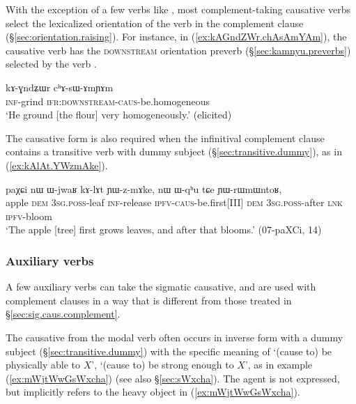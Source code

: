 With the exception of a few verbs like , most complement-taking causative verbs select the lexicalized orientation of the verb in the complement clause (§\ref{sec:orientation.raising}). For instance, in (\ref{ex:kAGndZWr.chAsAmYAm}), the causative verb  has the \textsc{downstream} orientation preverb  (§\ref{sec:kamnyu.preverbs}) selected by the verb .

\begin{exe}
\ex \label{ex:kAGndZWr.chAsAmYAm}
\gll kɤ-ɣndʑɯr cʰɤ-sɯ-ɤmɲɤm \\
\textsc{inf}-grind \textsc{ifr}:\textsc{downstream}-\textsc{caus}-be.homogeneous \\
\glt `He ground [the flour] very homogeneously.' (elicited)
\end{exe}

The causative form is also required when the infinitival complement clause contains a transitive verb with dummy subject (§\ref{sec:transitive.dummy}), as in (\ref{ex:kAlAt.YWzmAke}).

\begin{exe}
\ex \label{ex:kAlAt.YWzmAke}
\gll  paχɕi nɯ ɯ-jwaʁ kɤ-lɤt ɲɯ-z-mɤke, nɯ ɯ-qʰu tɕe ɲɯ-rɯmɯntoʁ, \\
apple \textsc{dem} \textsc{3sg}.\textsc{poss}-leaf \textsc{inf}-release \textsc{ipfv}-\textsc{caus}-be.first[III] \textsc{dem} \textsc{3sg}.\textsc{poss}-after \textsc{lnk} \textsc{ipfv}-bloom \\
\glt `The apple [tree] first grows leaves, and after that blooms.' (07-paXCi, 14)
\end{exe}



\subsubsection{Auxiliary verbs} \label{sec:sig.caus.modal}
A few auxiliary verbs can take the sigmatic causative, and are used with complement clauses in a way that is different from those treated in §\ref{sec:sig.caus.complement}. 

The causative  from the modal verb  often occurs in inverse form with a dummy subject (§\ref{sec:transitive.dummy}) with the specific meaning of  `(cause to) be physically able to $X$', `(cause to) be strong enough to $X$', as in example (\ref{ex:mWjtWwGsWxcha}) (see also §\ref{sec:sWxcha}). The agent is not expressed, but implicitly refers to the heavy object in (\ref{ex:mWjtWwGsWxcha}).  

